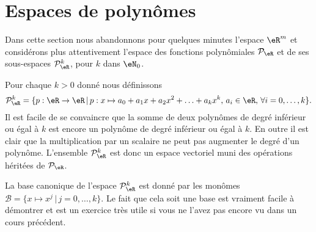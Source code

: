 \section{Espaces de polynômes}		\label{SecEspacePolynomes}
 
Dans cette section nous abandonnons pour quelques minutes l'espace $\eR^m$ et considérons plus attentivement l'espace des fonctions polynômiales $\mathcal{P}_{\eR}$ et de ses sous-espaces $\mathcal{P}_{\eR}^k$, pour $k$ dans $\eN_0$. 

Pour chaque $k>0$ donné nous définissons
\begin{equation}
\mathcal{P}_\eR^k=\{p:\eR\to \eR\,|\, p : x\mapsto a_0+a_1 x +a_2 x^2 + \ldots+a_k x^k, \, a_i\in\eR,\,\forall i=0,\ldots,k\}.
\end{equation}   
Il est facile de se convaincre que la somme de deux polynômes de degré inférieur ou égal à $k$ est encore un polynôme de degré inférieur ou égal à $k$. En outre il est clair que la multiplication par un scalaire ne peut pas augmenter le degré d'un polynôme. L'ensemble $\mathcal{P}_\eR^k$ est donc un espace vectoriel muni des opérations héritées de $\mathcal{P}_{\eR}$. 

La base canonique de l'espace $\mathcal{P}_\eR^k$ est donné par les monômes $\mathcal{B}=\{x\mapsto x^j \,|\, j=0, \ldots, k\}$. Le fait que cela soit une base est vraiment facile à démontrer et est un exercice très utile si vous ne l'avez pas encore vu dans un cours précédent. 

